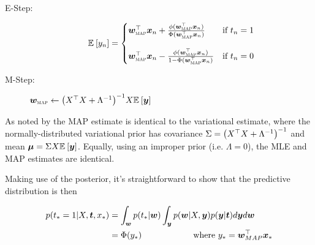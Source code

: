 \begin{description}
    \item[E-Step:]  \begin{equation*}
            \ex{y_n}{} = \left\{ \begin{matrix*}[l]
                \wmap\T\vv{x}_n + \frac{\phi(\wmap\T\vv{x}_n)}{\Phi(\wmap\T\vv{x}_n)} & \text{if } t_n = 1 \\
                \quad & \quad \\
                \wmap\T\vv{x}_n - \frac{\phi(\wmap\T\vv{x}_n)}{1 - \Phi(\wmap\T\vv{x}_n)} & \text{if } t_n = 0 
            \end{matrix*} \right.
        \end{equation*}
    \item[M-Step:] $\bm w_{\text{\tiny \sc MAP}} \leftarrow {\left( X ^\top X + \Lambda^{-1} \right)}^{-1}X\mathbb{E}_{ {  } }\left[ \bm y \right]$
\end{description}
As noted by \cite{Armagan2011} the MAP estimate is identical to the variational estimate, where the normally-distributed variational prior has covariance $\Sigma = {\left( X^\top X + \Lambda^{-1} \right)}^{-1}$ and mean $\bm \mu = \Sigma X \mathbb{E}_{ {  } }\left[ \bm y \right]$. Equally, using an improper prior (i.e. $\Lambda = 0$), the MLE and MAP estimates are identical.

Making use of the posterior, it's straightforward to show that the predictive distribution is then

\begin{align}
p(t_* = 1| X, \bm t, x_*) & = \int_{\bm w} p(t_* | \bm w)\int_{\bm y} p(\bm w| X, \bm y)p(\bm y|\bm t) d\bm y d\bm w \\
& = \Phi(y_*) \qquad \qquad \qquad \text{where }y_* = \bm w_{MAP}^\top\bm x_*
\end{align}

%
%

